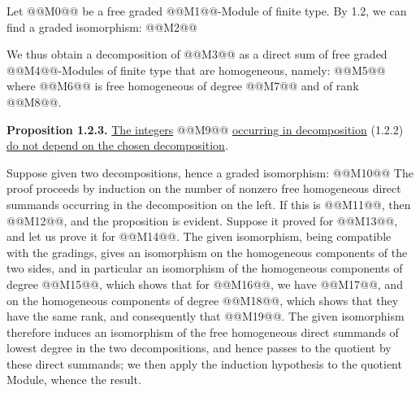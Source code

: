 Let @@M0@@ be a free graded @@M1@@-Module of finite type. By 1.2, we can find a graded isomorphism:
@@M2@@

We thus obtain a decomposition of @@M3@@ as a direct sum of free graded @@M4@@-Modules of finite type that are homogeneous, namely:
@@M5@@
where @@M6@@ is free homogeneous of degree @@M7@@ and of rank @@M8@@.

\textbf{Proposition 1.2.3.} \uline{The integers} @@M9@@ \uline{occurring in decomposition} (1.2.2) \uline{do not depend on the chosen decomposition}.

Suppose given two decompositions, hence a graded isomorphism:
@@M10@@
The proof proceeds by induction on the number of nonzero free homogeneous direct summands occurring in the decomposition on the left. If this is @@M11@@, then @@M12@@, and the proposition is evident. Suppose it proved for @@M13@@, and let us prove it for @@M14@@. The given isomorphism, being compatible with the gradings, gives an isomorphism on the homogeneous components of the two sides, and in particular an isomorphism of the homogeneous components of degree @@M15@@, which shows that for @@M16@@, we have @@M17@@, and on the homogeneous components of degree @@M18@@, which shows that they have the same rank, and consequently that @@M19@@. The given isomorphism therefore induces an isomorphism of the free homogeneous direct summands of lowest degree in the two decompositions, and hence passes to the quotient by these direct summands; we then apply the induction hypothesis to the quotient Module, whence the result.

